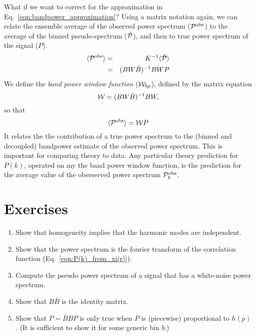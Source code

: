 What if we want to correct for the approximation in Eq.~\ref{eqn:bandpower_approximation}?  
Using a matrix notation again, we can relate the ensemble average of the observed power spectrum (${\cal P}^{\rm obs}$) to the average of the binned pseudo-spectrum ($\tilde {\cal P}$), and then to true power spectrum of the signal ($P$).
\begin{eqnarray}
  \langle {\cal P}^{\rm obs} \rangle &=& K^{-1} \langle \tilde {\cal P} \rangle \\
  &=&  (B W \bar B)^{-1} B W P \\
\end{eqnarray}
We define the \textit{band power window function} (${\cal W}_{bp}$), defined by the matrix equation
\begin{equation}
  {\cal W} = (B W \bar B)^{-1} B W,
\end{equation}
 so that
\begin{equation}
  \langle {\cal P}^{\rm obs} \rangle = {\cal W} P
\end{equation}
It relates the the contribution of a true power spectrum to the (binned and decoupled) bandpower estimate of the observed power spectrum.  This is important for comparing theory to data.  Any particular theory prediction for $P(k)$, operated on my the band power window function, is the prediction for the average value of the oberserved power spectrum ${\cal P}^{\rm obs}_b$.


\nocite{numerical_recipes,master,namaster}


\section*{Exercises}

\begin{enumerate}

\item Show that homogeneity implies that the harmonic modes are independent.

\item Show that the power spectrum is the fourier transform of the correlation function (Eq.~\ref{eqn:P(k)_from_xi(r)}).
  
\item Compute the pseudo power spectrum of a signal that has a white-noise power spectrum.

\item Show that $B\bar B$ is the identity matrix.

\item Show that $P = \bar B B P$ is only true when $P$ is (piecewise) proportional to $h(p)$.  (It is sufficient to show it for some generic bin $b$.)
  
\end{enumerate}


